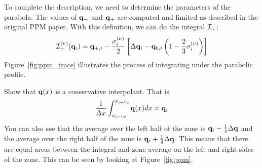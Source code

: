 To complete the description, we need to determine the parameters of
the parabola.  The values of ${\bf q}_-$ and ${\bf q}_+$ are computed and limited
as described in the original PPM paper.  With this definition, we can
do the integral ${\mathcal{I}}_+$:
\begin{equation}
{\mathcal{I}}_+^{(\nu)}({\bf q}_i) = {\bf q}_{+,i} - \frac{\sigma_i^{(\nu)}}{2}
   \left [ \Delta {\bf q}_i - {\bf q}_{6,i} \left ( 1 - \frac{2}{3} \sigma_i^{(\nu)} \right ) \right ]
\end{equation}
Figure~\ref{fig:ppm_trace} illustrates the process of integrating under
the parabolic profile.


\begin{exercise}
{Show that ${\bf q}(x)$ is a conservative interpolant.  That is
\begin{equation}
\frac{1}{\Delta x} \int_{x_{i-{\sfrac{1}{2}}}}^{x_{i+{\sfrac{1}{2}}}} {\bf q}(x) dx = {\bf q}_i
\end{equation}
You can also see that the average over the left half of the zone is
${\bf q}_i -\frac{1}{4}\Delta {\bf q}$ and the average over the right half of the
zone is ${\bf q}_i + \frac{1}{4}\Delta {\bf q}$.  This means that there are equal
areas between the integral and zone average on the left and right
sides of the zone.  This can be seen by looking at
Figure~\ref{fig:ppm}.  }
\end{exercise}

